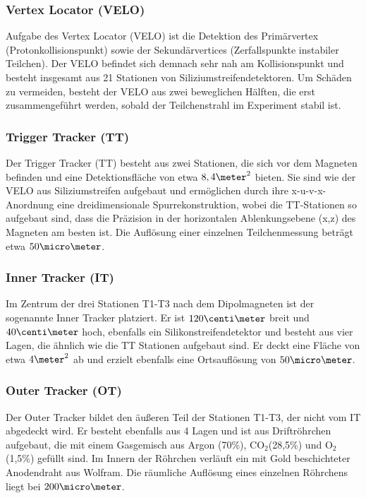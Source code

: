\subsubsection{Vertex Locator (VELO)}
Aufgabe des Vertex Locator (VELO) ist die Detektion des Primärvertex (Protonkollisionspunkt) sowie der Sekundärvertices (Zerfallspunkte instabiler Teilchen). Der VELO befindet sich demnach sehr nah am Kollisionspunkt und besteht insgesamt aus 21 Stationen von Siliziumstreifendetektoren. Um Schäden zu vermeiden, besteht der VELO aus zwei beweglichen Hälften, die erst zusammengeführt werden, sobald der Teilchenstrahl im Experiment stabil ist.

\subsubsection{Trigger Tracker (TT)}
Der Trigger Tracker (TT) besteht aus zwei Stationen, die sich vor dem Magneten befinden und eine Detektionsfläche von etwa $8,4\meter^2$ bieten. Sie sind wie der VELO aus Siliziumstreifen aufgebaut und ermöglichen durch ihre x-u-v-x-Anordnung eine dreidimensionale Spurrekonstruktion, wobei die TT-Stationen so aufgebaut sind, dass die Präzision in der horizontalen Ablenkungsebene (x,z) des Magneten am besten ist. Die Auflösung einer einzelnen Teilchenmessung beträgt etwa $50\micro\meter$.

\subsubsection{Inner Tracker (IT)}
Im Zentrum der drei Stationen T1-T3 nach dem Dipolmagneten ist der sogenannte Inner Tracker platziert. Er ist $120\centi\meter$ breit und $40\centi\meter$ hoch, ebenfalls ein Silikonstreifendetektor und besteht aus vier Lagen, die ähnlich wie die TT Stationen aufgebaut sind. Er deckt eine Fläche von etwa $4\meter^2$ ab und erzielt ebenfalls eine Ortsauflösung von $50\micro\meter$.

\subsubsection{Outer Tracker (OT)}
Der Outer Tracker bildet den äußeren Teil der Stationen T1-T3, der nicht vom IT abgedeckt wird. Er besteht ebenfalls aus 4 Lagen und ist aus Driftröhrchen aufgebaut, die mit einem Gasgemisch aus Argon (70\%), CO$_2$(28,5\%) und O$_2$ (1,5\%) gefüllt sind. Im Innern der Röhrchen verläuft ein mit Gold beschichteter Anodendraht aus Wolfram. Die räumliche Auflösung eines einzelnen Röhrchens liegt bei $200\micro\meter$.

